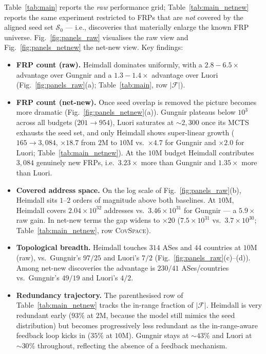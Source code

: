 \documentclass[conference]{IEEEtran}
\begin{document}
Table~\ref{tab:main} reports the \emph{raw} performance grid;
Table~\ref{tab:main_netnew} reports the same experiment
restricted to FRPs that are \emph{not} covered by the aligned
seed set $\mathcal{S}_{0}$ --- i.e., discoveries that materially
enlarge the known FRP universe.  Fig.~\ref{fig:panels_raw}
visualises the raw view and Fig.~\ref{fig:panels_netnew} the
net-new view.  Key findings:
\begin{itemize}
   \item \textbf{FRP count (raw).}  Heimdall dominates uniformly,
   with a $2.8\!-\!6.5\times$ advantage over Gungnir and a
   $1.3\!-\!1.4\times$ advantage over Luori
   (Fig.~\ref{fig:panels_raw}(a); Table~\ref{tab:main}, row
   $|\mathcal{F}|$).
   \item \textbf{FRP count (net-new).}  Once seed overlap is
   removed the picture becomes more dramatic
   (Fig.~\ref{fig:panels_netnew}(a)).  Gungnir plateaus below
   $10^{3}$ across all budgets ($201\!\to\!954$), Luori saturates
   at $\sim\!2{,}300$ once its MCTS exhausts the seed set, and
   only Heimdall shows super-linear growth
   ($165\!\to\!3{,}084$, $\times 18.7$ from $2$M to $10$M vs.\
   $\times 4.7$ for Gungnir and $\times 2.0$ for Luori;
   Table~\ref{tab:main_netnew}).  At the $10$M budget Heimdall
   contributes $3{,}084$ genuinely new FRPs, i.e.\ $3.23\times$
   more than Gungnir and $1.35\times$ more than Luori.
   \item \textbf{Covered address space.}  On the log scale of
   Fig.~\ref{fig:panels_raw}(b), Heimdall sits $1$--$2$ orders of
   magnitude above both baselines.  At $10$M, Heimdall covers
   $2.04\!\times\!10^{32}$ addresses vs.\
   $3.46\!\times\!10^{31}$ for Gungnir --- a $5.9\times$ raw
   gain.  In net-new terms the gap widens to $\times 20$
   ($7.5\!\times\!10^{31}$ vs.\ $3.7\!\times\!10^{30}$;
   Table~\ref{tab:main_netnew}, row \textsc{CovSpace}).
   \item \textbf{Topological breadth.}  Heimdall touches $314$
   ASes and $44$ countries at $10$M (raw), vs.\ Gungnir's
   $97/25$ and Luori's $7/2$
   (Fig.~\ref{fig:panels_raw}(c)--(d)).  Among net-new
   discoveries the advantage is $230/41$ ASes/countries vs.\
   Gungnir's $49/19$ and Luori's $4/2$.
   \item \textbf{Redundancy trajectory.}  The parenthesised row
   of Table~\ref{tab:main_netnew} tracks the in-range fraction
   of $|\mathcal{F}|$.  Heimdall is very redundant early ($93\%$
   at $2$M, because the model still mimics the seed
   distribution) but becomes progressively less redundant as
   the in-range-aware feedback loop kicks in ($35\%$ at $10$M).
   Gungnir stays at $\sim\!43\%$ and Luori at $\sim\!30\%$
   throughout, reflecting the absence of a feedback mechanism.
\end{itemize}
\end{document}
